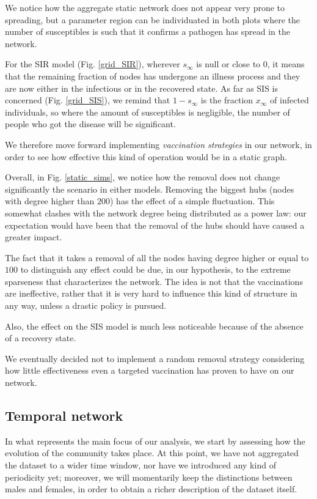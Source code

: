 \documentclass[a4paper,11pt, twocolumn]{article}
\begin{document}
We notice how the aggregate static network does not appear very prone to spreading, but a parameter region can be individuated in both plots where the number of susceptibles is such that it confirms a pathogen has spread in the network.

For the SIR model (Fig. \ref{grid_SIR}), wherever $s_{\infty}$ is null or close to 0, it means that the remaining fraction of nodes has undergone an illness process and they are now either in the infectious or in the recovered state. As far as SIS is concerned (Fig. \ref{grid_SIS}), we remind that $1-s_{\infty}$ is the fraction $x_{\infty}$ of infected individuals, so where the amount of susceptibles is negligible, the number of people who got the disease will be significant.

We therefore move forward implementing \emph{vaccination strategies} in our network, in order to see how effective this kind of operation would be in a static graph.

Overall, in Fig. \ref{static_sims}, we notice how the removal does not change significantly the scenario in either models. Removing the biggest hubs (nodes with degree higher than $200$) has the effect of a simple fluctuation. This somewhat clashes with the network degree being distributed as a power law: our expectation would have been that the removal of the hubs should have caused a greater impact.

The fact that it takes a removal of all the nodes having degree higher or equal to $100$ to distinguish any effect could be due, in our hypothesis, to the extreme sparseness that characterizes the network. The idea is not that the vaccinations are ineffective, rather that it is very hard to influence this kind of structure in any way, unless a drastic policy is pursued.

Also, the effect on the SIS model is much less noticeable because of the absence of a recovery state.

We eventually decided not to implement a random removal strategy considering how little effectiveness even a targeted vaccination has proven to have on our network.



\subsection{Temporal network}
In what represents the main focus of our analysis, we start by assessing how the evolution of the community takes place. At this point, we have not aggregated the dataset to a wider time window, nor have we introduced any kind of periodicity yet; moreover, we will momentarily keep the distinctions between males and females, in order to obtain a richer description of the dataset itself.
\end{document}

